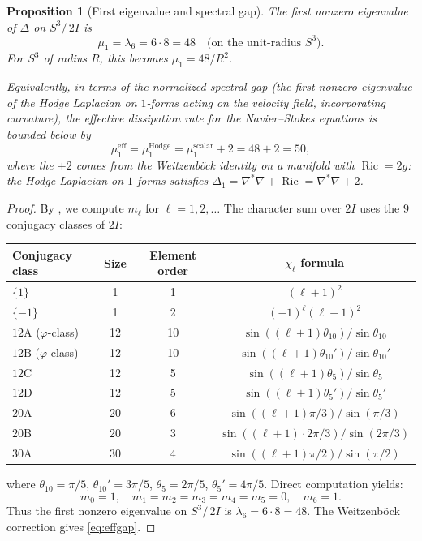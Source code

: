 \documentclass[11pt,a4paper]{article}
\theoremstyle{plain}
\newtheorem{proposition}[theorem]{Proposition}
\theoremstyle{definition}
\DeclareMathOperator{\Ric}{Ric}
\newcommand{\phig}{\varphi}              %
\newcommand{\Lap}{\Delta}                 %
\newcommand{\DS}{S^3\!/\,2I}             %
\newcommand{\BI}{2I}                      %
\begin{document}
\begin{proposition}[First eigenvalue and spectral gap]\label{prop:specgap}
The first nonzero eigenvalue of $\Lap$ on $\DS$ is
\begin{equation}\label{eq:specgap}
  \mu_1 = \lambda_6 = 6 \cdot 8 = 48 \quad
  \text{(on the unit-radius $S^3$)}.
\end{equation}
For $S^3$ of radius $R$, this becomes $\mu_1 = 48/R^2$.

\smallskip\noindent
Equivalently, in terms of the \emph{normalized} spectral gap (the first
nonzero eigenvalue of the Hodge Laplacian on $1$-forms acting on the
velocity field, incorporating curvature), the effective dissipation rate for
the Navier--Stokes equations is bounded below by
\begin{equation}\label{eq:effgap}
  \mu_1^{\text{eff}} = \mu_1^{\text{Hodge}} = \mu_1^{\text{scalar}} + 2
  = 48 + 2 = 50,
\end{equation}
where the $+2$ comes from the Weitzenb\"{o}ck identity on a manifold with
$\Ric = 2g$: the Hodge Laplacian on $1$-forms satisfies $\Lap_1 = \nabla^*
\nabla + \Ric = \nabla^* \nabla + 2$.
\end{proposition}

\begin{proof}
By , we compute $m_\ell$ for $\ell = 1,2,\ldots$
The character sum over $\BI$ uses the $9$ conjugacy classes of $\BI$:
\begin{center}
\renewcommand{\arraystretch}{1.1}
\begin{tabular}{@{}lccc@{}}
\toprule
Conjugacy class & Size & Element order & $\chi_\ell$ formula \\
\midrule
$\{1\}$ & 1 & 1 & $(\ell+1)^2$ \\
$\{-1\}$ & 1 & 2 & $(-1)^\ell (\ell+1)^2$ \\
$12\text{A}$ ($\phig$-class) & 12 & 10 & $\sin((\ell{+}1)\theta_{10}) / \sin\theta_{10}$ \\
$12\text{B}$ ($\overline\phig$-class) & 12 & 10 & $\sin((\ell{+}1)\theta_{10}') / \sin\theta_{10}'$ \\
$12\text{C}$ & 12 & 5 & $\sin((\ell{+}1)\theta_5) / \sin\theta_5$ \\
$12\text{D}$ & 12 & 5 & $\sin((\ell{+}1)\theta_5') / \sin\theta_5'$ \\
$20\text{A}$ & 20 & 6 & $\sin((\ell{+}1)\pi/3) / \sin(\pi/3)$ \\
$20\text{B}$ & 20 & 3 & $\sin((\ell{+}1) \cdot 2\pi/3) / \sin(2\pi/3)$ \\
$30\text{A}$ & 30 & 4 & $\sin((\ell{+}1)\pi/2) / \sin(\pi/2)$ \\
\bottomrule
\end{tabular}
\end{center}
where $\theta_{10} = \pi/5$, $\theta_{10}' = 3\pi/5$, $\theta_5 = 2\pi/5$,
$\theta_5' = 4\pi/5$.  Direct computation yields:
\[
  m_0 = 1, \quad
  m_1 = m_2 = m_3 = m_4 = m_5 = 0, \quad
  m_6 = 1.
\]
Thus the first nonzero eigenvalue on $\DS$ is $\lambda_6 = 6 \cdot 8 = 48$.
The Weitzenb\"{o}ck correction gives \eqref{eq:effgap}.
\end{proof}
\end{document}
